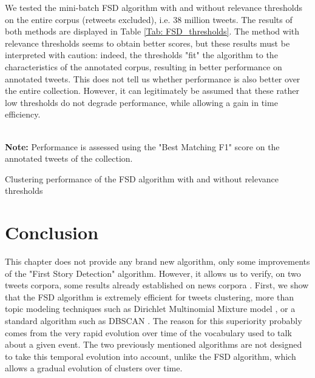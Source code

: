 We tested the mini-batch FSD algorithm with and without relevance thresholds on the entire corpus (retweets excluded), i.e. 38 million tweets.  The results of both methods are displayed in Table \ref{Tab: FSD_thresholds}. The method with relevance thresholds seems to obtain better scores, but these results must be interpreted with caution: indeed, the thresholds "fit" the algorithm to the characteristics of the annotated corpus, resulting in better performance on annotated tweets. This does not tell us whether performance is also better over the entire collection. However, it can legitimately be assumed that these rather low thresholds do not degrade performance, while allowing a gain in time efficiency.

\begin{table}[ht]
\begin{center}

\\

{\scriptsize \textbf{Note:} Performance is assessed using the "Best Matching F1" score on the annotated tweets of the collection.}
\caption{Clustering performance of the FSD algorithm with and without relevance thresholds} \label{Tab: FSD_thresholds}
\end{center}
\end{table}


\section{Conclusion}

This chapter does not provide any brand new algorithm, only some improvements of the "First Story Detection" algorithm. However, it allows us to verify, on two tweets corpora, some results already established on news corpora \citep{cage2020production}. First, we show that the FSD algorithm is extremely efficient for tweets clustering, more than topic modeling techniques such as Dirichlet Multinomial Mixture model \citep{yin_dirichlet_2014}, or a standard algorithm such as DBSCAN \citep{ester1996density}.  The reason for this superiority probably comes from the very rapid evolution over time of the vocabulary used to talk about a given event. The two previously mentioned algorithms are not designed to take this temporal evolution into account, unlike the FSD algorithm, which allows a gradual evolution of clusters over time.

